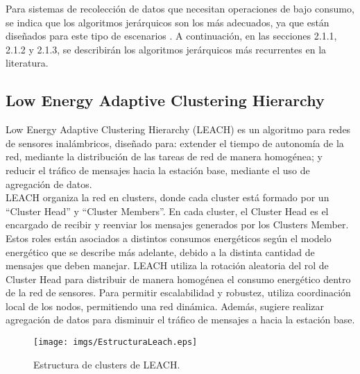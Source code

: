Para sistemas de recolección de datos que necesitan operaciones de bajo consumo, se indica que los algoritmos jerárquicos son los más adecuados, ya que están diseñados para este tipo de escenarios \cite{WSNSurvey}. A continuación, en las secciones 2.1.1, 2.1.2 y 2.1.3, se describirán los algoritmos jerárquicos más recurrentes en la literatura.

\subsection{Low Energy Adaptive Clustering Hierarchy}
Low Energy Adaptive Clustering Hierarchy (LEACH) \cite{LeachOriginal}es un algoritmo para redes de sensores inalámbricos, diseñado para: extender el tiempo de autonomía de la red, mediante la distribución de las tareas de red de manera homogénea; y reducir el tráfico de mensajes hacia la estación base, mediante el uso de agregación de datos.\\

LEACH organiza la red en clusters, donde cada cluster está formado por un ``Cluster Head'' y ``Cluster Members''. En cada cluster, el Cluster Head es el encargado de recibir y reenviar los mensajes generados por los Clusters Member. Estos roles están asociados a distintos consumos energéticos según el modelo energético que se describe más adelante, debido a la distinta cantidad de mensajes que deben manejar. LEACH utiliza la rotación aleatoria del rol de Cluster Head para distribuir de manera homogénea el consumo energético dentro de la red de sensores. Para permitir escalabilidad y robustez, utiliza coordinación local de los nodos, permitiendo una red dinámica. Además, sugiere realizar agregación de datos para disminuir el tráfico de mensajes a hacia la estación base.

\begin{center}
\begin{figure}[h!]
\centering
 \texttt{[image: imgs/EstructuraLeach.eps]} 
\caption{Estructura de clusters de LEACH.}
\end{figure}
\end{center}



